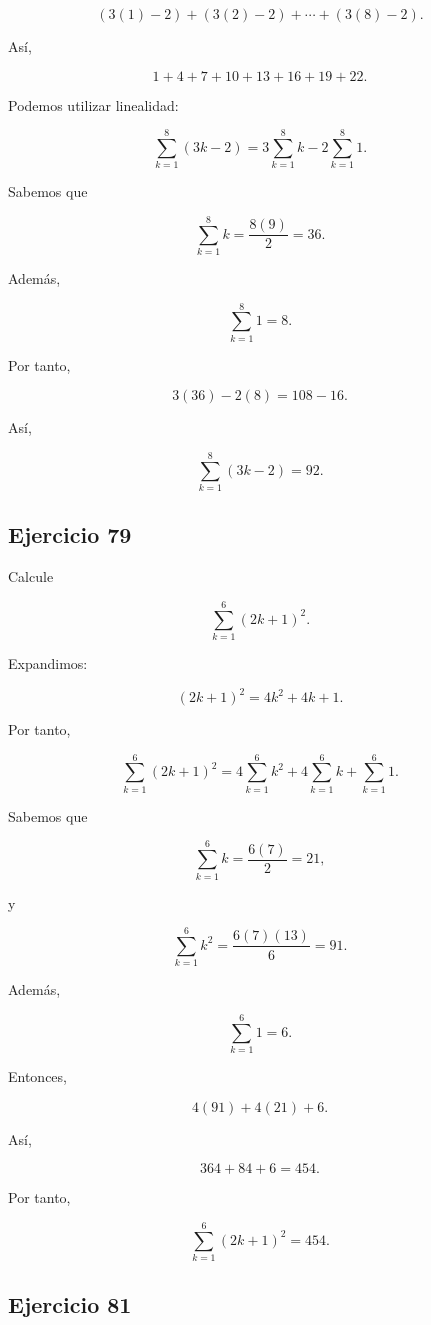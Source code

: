 \documentclass[12pt]{article}
\begin{document}
\[
(3(1)-2)
+
(3(2)-2)
+\cdots+
(3(8)-2).
\]

Así,

\[
1+4+7+10+13+16+19+22.
\]

Podemos utilizar linealidad:

\[
\sum_{k=1}^{8}(3k-2)
=
3\sum_{k=1}^{8}k
-
2\sum_{k=1}^{8}1.
\]

Sabemos que

\[
\sum_{k=1}^{8}k
=
\frac{8(9)}2
=
36.
\]

Además,

\[
\sum_{k=1}^{8}1=8.
\]

Por tanto,

\[
3(36)-2(8)
=
108-16.
\]

Así,

\[
\boxed{
\sum_{k=1}^{8}(3k-2)=92
}.
\]

\subsection*{Ejercicio 79}

Calcule

\[
\sum_{k=1}^{6}(2k+1)^2.
\]

Expandimos:

\[
(2k+1)^2
=
4k^2+4k+1.
\]

Por tanto,

\[
\sum_{k=1}^{6}(2k+1)^2
=
4\sum_{k=1}^{6}k^2
+
4\sum_{k=1}^{6}k
+
\sum_{k=1}^{6}1.
\]

Sabemos que

\[
\sum_{k=1}^{6}k
=
\frac{6(7)}2
=
21,
\]

y

\[
\sum_{k=1}^{6}k^2
=
\frac{6(7)(13)}6
=
91.
\]

Además,

\[
\sum_{k=1}^{6}1=6.
\]

Entonces,

\[
4(91)+4(21)+6.
\]

Así,

\[
364+84+6=454.
\]

Por tanto,

\[
\boxed{
\sum_{k=1}^{6}(2k+1)^2=454
}.
\]

\subsection*{Ejercicio 81}
\end{document}
